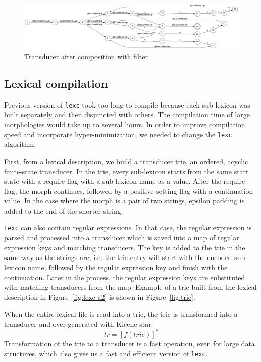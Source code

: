 \documentclass[11pt]{article}
\begin{document}
\begin{figure}
    \includegraphics[width=\textwidth]{after_comp.png}
     \caption{Transducer after composition with filter
     \label{fig:after}}
\end{figure}



\subsection{Lexical compilation}

Previous version of \texttt{lexc} took too long to compile because each sub-lexicon was built separately and then disjuncted with others. The compilation time of large morphologies would take up to several hours. In order to improve compilation speed and incorporate hyper-minimization, we needed to change the \texttt{lexc} algorithm.

First, from a lexical description, we build a transducer trie, an ordered, acyclic finite-state transducer. In the trie, every sub-lexicon 
starts from the same start state with a require flag with a sub-lexicon name as a value. After the require flag, the morph continues, followed 
by a positive setting flag with a continuation value. In the case where the morph is a pair of two strings, epsilon padding is added to the end of 
the shorter string.

\texttt{Lexc} can also contain regular expressions. In that case, the regular expression is parsed and processed into a transducer which is saved into 
a map of regular expression keys and matching transducers. The key is added to the trie in the same way as the strings are, i.e. the trie entry will start with 
the encoded sub-lexicon name, followed by the regular expression key and finish with the continuation. Later in the process, the regular expression 
keys are substituted with matching transducers from the map. 
Example of a trie built from the lexical description in Figure~\ref{fig:lexc-a2} is shown in Figure~\ref{fig:trie}.

When the entire lexical file is read into a trie, the trie is transformed into a transducer and over-generated with Kleene star:
\begin{equation}\label{eq:trie_star}
tr = \left[f(trie)\right]^* 
\end{equation}
Transformation of the trie to a transducer is a fast operation, even for large data structures, which also gives us a fast and efficient version of \texttt{lexc}.
\end{document}
